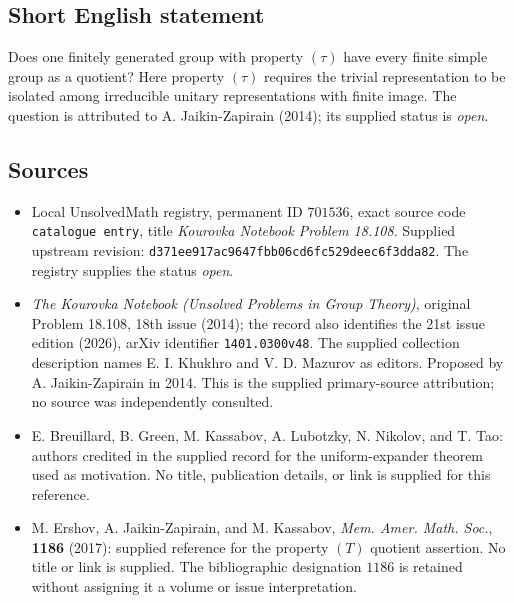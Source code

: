 \documentclass[11pt]{article}
\begin{document}
\subsection{Short English statement}
Does one finitely generated group with property \((\tau)\) have every finite simple group as a quotient? Here property \((\tau)\) requires the trivial representation to be isolated among irreducible unitary representations with finite image. The question is attributed to A. Jaikin-Zapirain (2014); its supplied status is \emph{open}.
\subsection{Sources}
\begin{itemize}
\item Local UnsolvedMath registry, permanent ID \(701536\), exact source code \texttt{catalogue entry}, title \emph{Kourovka Notebook Problem 18.108}. Supplied upstream revision: \texttt{d371ee917ac9647fbb06cd6fc529deec6f3dda82}. The registry supplies the status \emph{open}.
\item \emph{The Kourovka Notebook (Unsolved Problems in Group Theory)}, original Problem 18.108, 18th issue (2014); the record also identifies the 21st issue edition (2026), arXiv identifier \texttt{1401.0300v48}. The supplied collection description names E. I. Khukhro and V. D. Mazurov as editors. Proposed by A. Jaikin-Zapirain in 2014. This is the supplied primary-source attribution; no source was independently consulted.
\item E. Breuillard, B. Green, M. Kassabov, A. Lubotzky, N. Nikolov, and T. Tao: authors credited in the supplied record for the uniform-expander theorem used as motivation. No title, publication details, or link is supplied for this reference.
\item M. Ershov, A. Jaikin-Zapirain, and M. Kassabov, \emph{Mem. Amer. Math. Soc.}, \textbf{1186} (2017): supplied reference for the property \((T)\) quotient assertion. No title or link is supplied. The bibliographic designation \(1186\) is retained without assigning it a volume or issue interpretation.
\end{itemize}
\end{document}
